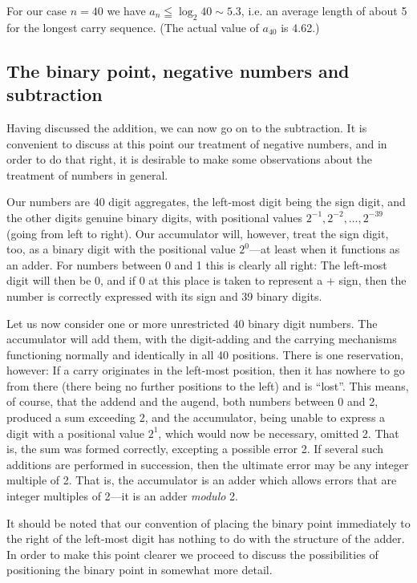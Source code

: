 \documentclass[12pt]{amsart}
\begin{document}
For our case $n = 40$ we have $a_n \leqq \log_2 40 \sim 5.3$, i.e. an average length of about 5 for the longest carry sequence. (The actual value of $a_{40}$ is 4.62.)

\subsection{The binary point, negative numbers and subtraction}
Having discussed the addition, we can now go on to the subtraction. It is convenient to discuss at this point our treatment of negative numbers, and in order to do that right, it is desirable to make some observations about the treatment of numbers in general.

Our numbers are 40 digit aggregates, the left-most digit being the sign digit, and the other digits genuine binary digits, with positional values $2^{-1}, 2^{-2}, \dots , 2^{-39}$ (going from left to right). Our accumulator will, however, treat the sign digit, too, as a binary digit with the positional value $2^0$---at least when it functions as an adder. For numbers between 0 and 1 this is clearly all right: The left-most digit will then be 0, and if 0 at this place is taken to represent a + sign, then the number is correctly expressed with its sign and 39 binary digits.

Let us now consider one or more unrestricted 40 binary digit numbers. The accumulator will add them, with the digit-adding and the carrying mechanisms functioning normally and identically in all 40 positions. There is one reservation, however: If a carry originates in the left-most position, then it has nowhere to go from there (there being no further positions to the left) and is ``lost''. This means, of course, that the addend and the augend, both numbers between 0 and 2, produced a sum exceeding 2, and the accumulator, being unable to express a digit with a positional value $2^1$, which would now be necessary, omitted 2. That is, the sum was formed correctly, excepting a possible error 2. If several such additions are performed in succession, then the ultimate error may be any integer multiple of 2. That is, the accumulator is an adder which allows errors that are integer multiples of 2---it is an adder \emph{modulo} 2.

It should be noted that our convention of placing the binary point immediately to the right of the left-most digit has nothing to do with the structure of the adder. In order to make this point clearer we proceed to discuss the possibilities of positioning the binary point in somewhat more detail.
\end{document}
